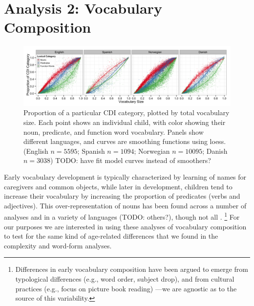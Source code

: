 \documentclass[10pt,letterpaper]{article}
\begin{document}
\section{Analysis 2: Vocabulary Composition}

\begin{figure}[t]
\begin{center}
\includegraphics[width=\textwidth]{plots/composition.png}
\end{center}
\caption{\label{fig:vocab_comp} Proportion of a particular CDI category, plotted by total vocabulary size. Each point shows an individual child, with color showing their noun, predicate, and function word vocabulary. Panels show different languages, and curves are smoothing functions using loess. (English $n=5595$; Spanish $n=1094$; Norwegian $n=10095$; Danish $n=3038$) TODO: have fit model curves instead of smoothers?} 
\end{figure}

Early vocabulary development is typically characterized by learning of names for caregivers and common objects, while later in development, children tend to increase their vocabulary by increasing the proportion of predicates (verbs and adjectives). This over-representation of nouns has been found across a number of analyses and in a variety of languages \cite{bates1994}(TODO: others?), though not all \cite{caselli1995}.
\footnote{Differences in early vocabulary composition have been argued to emerge from typological differences (e.g., word order, subject drop), and from cultural practices (e.g., focus on picture book reading) \cite{tardif1999, gopnik1996, choi1995}---we are agnostic as to the source of this variability.}
For our purposes we are interested in using these analyses of vocabulary composition to test for the same kind of age-related differences that we found in the complexity and word-form analyses. 
\end{document}
